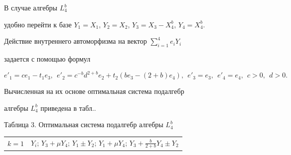  


В случае алгебры $L^b_4$ 


удобно перейти к базе $Y_1=X_1$, $Y_2=X_2$, $Y_3=X_3-X^b_4$, $Y_4=X^b_4$.  


Действие внутреннего автоморфизма на вектор $\sum\limits^4_{i=1}e_iY_i$  


задается с помощью формул 


$$ 


e'_1=ce_1-t_1e_3,\ \ e'_2=c^{-b}d^{2+b}e_2+t_2 


(be_3-(2+b)e_4),\ \ e'_3=e_3,\ \ e'_4=e_4,\ \ c>0,\ \ d>0. 


$$ 


Вычисленная на их основе оптимальная система подалгебр 


алгебры $L^b_4$ приведена в табл.. 


 





 


\begin{center} 


Таблица 3. Оптимальная система подалгебр алгебры $L^b_4$ 


\begin{tabular}{|p{1cm}|p{14cm}|} 


\hline 


$k=1$ & \parbox{14cm}{$Y_i$; $Y_3+\mu Y_4$; $Y_1\pm Y_2$; $Y_1+\mu 


Y_4$; $Y_3+\frac{b}{2+b}Y_4\pm Y_2$}\\ 


\hline 


$k=2$ & \parbox{14cm}{$Y_i$, $Y_j$; $Y_1$, $Y_3+\mu Y_4$; $Y_2$, 


$Y_3+\mu Y_4$; $Y_2$, $Y_1+\mu Y_4$; $Y_1\pm Y_2$, 


$Y_3+\frac{b+1}{b+2}Y_4$; $Y_1$, $Y_3+\frac{b}{b+2}Y_4\pm Y_2$}\\ 


\hline 


$k=3$ & \parbox{14cm}{$Y_i$, $Y_j$, $Y_s$; $Y_1$, $Y_2$, $Y_3+\mu Y_4$}\\ 


\hline 


\end{tabular} 


\end{center} 


 


